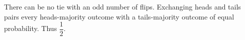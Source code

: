 There can be no tie with an odd number of flips. Exchanging heads and tails pairs every heads-majority outcome with a tails-majority outcome of equal probability. Thus $\boxed{\dfrac{1}{2}}$.
